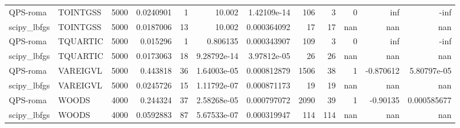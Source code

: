 \documentclass[a4paper]{article}
\begin{document}
\begin{tabular}{llrrrrrrrrrr}
	QPS-roma    & TOINTGSS &  5000 &  0.0240901  &      1 &     10.002       & 1.42109e-14 &      106 &        3 &        0 & inf           & -inf           \\
	scipy\_lbfgs & TOINTGSS &  5000 &  0.0187006  &     13 &     10.002       & 0.000364092 &       17 &       17 &      nan & nan           &  nan           \\
	QPS-roma    & TQUARTIC &  5000 &  0.015296   &      1 &      0.806135    & 0.000343907 &      109 &        3 &        0 & inf           & -inf           \\
	scipy\_lbfgs & TQUARTIC &  5000 &  0.0173063  &     18 &      9.28792e-14 & 3.97812e-05 &       26 &       26 &      nan & nan           &  nan           \\
	QPS-roma    & VAREIGVL &  5000 &  0.443818   &     36 &      1.64003e-05 & 0.000812879 &     1506 &       38 &        1 &  -0.870612    &    5.80797e-05 \\
	scipy\_lbfgs & VAREIGVL &  5000 &  0.0245726  &     15 &      1.11792e-07 & 0.000871173 &       19 &       19 &      nan & nan           &  nan           \\
	QPS-roma    & WOODS    &  4000 &  0.244324   &     37 &      2.58268e-05 & 0.000797072 &     2090 &       39 &        1 &  -0.90135     &    0.000585677 \\
	scipy\_lbfgs & WOODS    &  4000 &  0.0592883  &     87 &      5.67533e-07 & 0.000319947 &      114 &      114 &      nan & nan           &  nan           \\
	\hline
\end{tabular}
\end{document}
